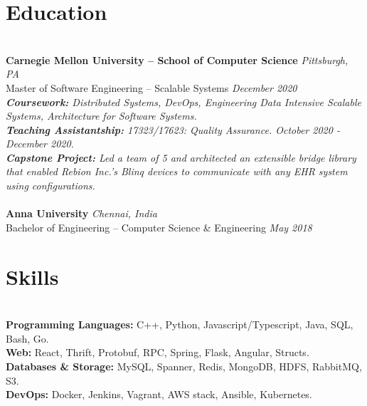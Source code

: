 \documentclass{resume}
\begin{document}
\section*{Education}
\titlerule[0.2pt]
\noindent
\\
\textbf{Carnegie Mellon University -- School of Computer Science} \hfill \textit{Pittsburgh, PA} \\
{\small Master of Software Engineering -- Scalable Systems} \hfill \textit{\small December 2020}\\
\textit{\textbf{Coursework:} Distributed Systems, DevOps, Engineering Data Intensive Scalable Systems, Architecture for Software Systems.}\\
\textit{\textbf{Teaching Assistantship:} 17323/17623: Quality Assurance. October 2020 - December 2020.}\\
\textit{\textbf{Capstone Project:} Led a team of 5 and architected an extensible bridge library that enabled Rebion Inc.'s Blinq devices to communicate with any EHR system using configurations.}\\
\\
\textbf{Anna University} \hfill \textit{Chennai, India} \\
{\small Bachelor of Engineering -- Computer Science \& Engineering} \hfill \textit{\small May 2018}

\section*{Skills}
\titlerule[0.2pt]
\noindent
\\
\textbf{Programming Languages:} C++, Python, Javascript/Typescript, Java, SQL, Bash, Go. \\
\textbf{Web:} React, Thrift, Protobuf, RPC, Spring, Flask, Angular, Structs. \\
\textbf{Databases \& Storage:} MySQL, Spanner, Redis, MongoDB, HDFS, RabbitMQ, S3. \\
\textbf{DevOps:} Docker, Jenkins, Vagrant, AWS stack, Ansible, Kubernetes. \\

\end{document}
